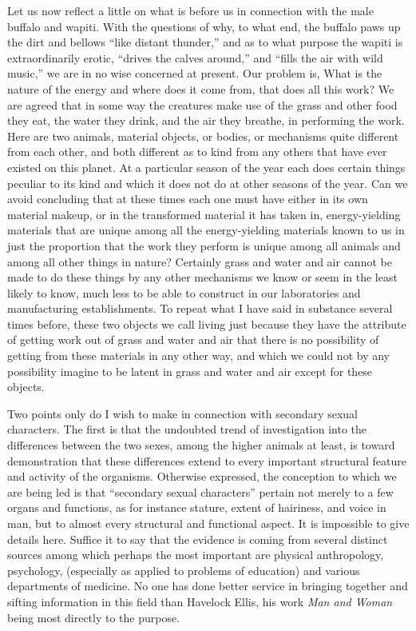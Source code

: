 \documentclass[a4paper, 11pt, oneside, polutonikogreek, english]{article}
\begin{document}
Let us now reflect a little on what is before us in connection with the male buffalo and wapiti. With the questions of why, to what end, the buffalo paws up the dirt and bellows ``like distant thunder,'' and as to what purpose the wapiti is extraordinarily erotic, ``drives the calves around,'' and ``fills the air with wild music,'' we are in no wise concerned at present. Our problem is, What is the nature of the energy and where does it come from, that does all this work? We are agreed that in some way the creatures make use of the grass and other food they eat, the water they drink, and the air they breathe, in performing the work. Here are two animals, material objects, or bodies, or mechanisms quite different from each other, and both different as to kind from any others that have ever existed on this planet. At a particular season of the year each does certain things peculiar to its kind and which it does not do at other seasons of the year. Can we avoid concluding that at these times each one must have either in its own material makeup, or in the transformed material it has taken in, energy-yielding materials that are unique among all the energy-yielding materials known to us in just the proportion that the work they perform is unique among all animals and among all other things in nature? Certainly grass and water and air cannot be made to do these things by any other mechanisms we know or seem in the least likely to know, much less to be able to construct in our laboratories and manufacturing establishments. To repeat what I have said in substance several times before, these two objects we call living just because they have the attribute of getting work out of grass and water and air that there is no possibility of getting from these materials in any other way, and which we could not by any possibility imagine to be latent in grass and water and air except for these objects.

Two points only do I wish to make in connection with secondary sexual characters. The first is that the undoubted trend of investigation into the differences between the two sexes, among the higher animals at least, is toward demonstration that these differences extend to every important structural feature and activity of the organisms. Otherwise expressed, the conception to which we are being led is that ``secondary sexual characters'' pertain not merely to a few organs and functions, as for instance stature, extent of hairiness, and voice in man, but to almost every structural and functional aspect. It is impossible to give details here. Suffice it to say that the evidence is coming from several distinct sources among which perhaps the most important are physical anthropology, psychology, (especially as applied to problems of education) and various departments of medicine. No one has done better service in bringing together and sifting information in this field than Havelock Ellis, his work \emph{Man and Woman} being most directly to the purpose.
\end{document}
